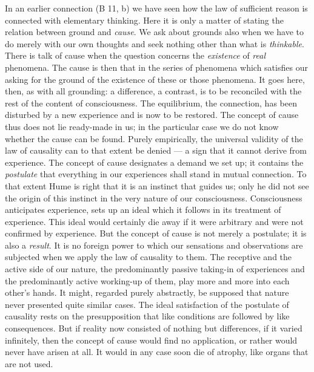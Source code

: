 \documentclass[12pt,a4paper]{book}
\newcommand{\opage}[1]{\marginnote{\footnotesize\textit{[#1]}}}
\begin{document}
In an earlier connection (B 11, b) we have seen how the law of sufficient
reason is connected with elementary thinking. Here it is only a matter
of stating the relation between ground and \emph{cause}. We ask about
grounds also when we have to do merely with our own thoughts and seek
nothing other than what is \emph{thinkable}. There is talk of cause when
the question concerns the \emph{existence} of \emph{real} phenomena. The
cause is then that in the series of phenomena which satisfies our asking
for the ground of the existence of these or those phenomena. It goes
here, then, as with all grounding: a difference, a contrast, is to be
reconciled with the rest of the content of consciousness. The
equilibrium, the connection, has been disturbed by a new experience and
is now to be restored. The concept of cause thus does not lie ready-made
in us; in the particular case we do not know whether the cause can be
found. Purely empirically, the universal validity of the law of
causality can to that extent be denied --- a sign that it cannot derive
from experience. The concept of cause designates a demand we set up; it
contains the \emph{postulate} that everything in our experiences shall
stand in mutual connection. To that extent
\opage{259}Hume is right that it is an instinct that guides us; only he
did not see the origin of this instinct in the very nature of our
consciousness. Consciousness anticipates experience, sets up an ideal
which it follows in its treatment of experience. This ideal would
certainly die away if it were arbitrary and were not confirmed by
experience. But the concept of cause is not merely a postulate; it is
also a \emph{result}. It is no foreign power to which our sensations and
observations are subjected when we apply the law of causality to them.
The receptive and the active side of our nature, the predominantly
passive taking-in of experiences and the predominantly active working-up
of them, play more and more into each other's hands. It might, regarded
purely abstractly, be supposed that nature never presented quite similar
cases. The ideal satisfaction of the postulate of causality rests on the
presupposition that like conditions are followed by like consequences.
But if reality now consisted of nothing but differences, if it varied
infinitely, then the concept of cause would find no application, or
rather would never have arisen at all. It would in any case soon die of
atrophy, like organs that are not used.
\end{document}
